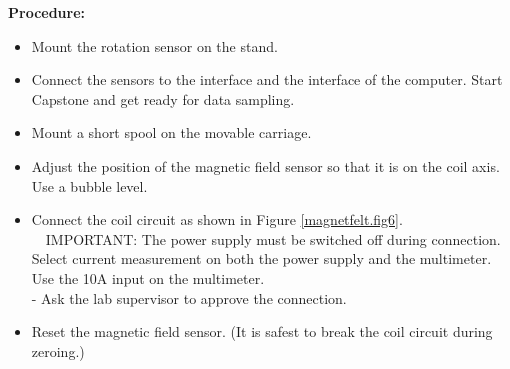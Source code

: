 \documentclass[../Elmag-labhefte-2020.tex]{subfiles}
\begin{document}
\textbf{Procedure:}
\begin{itemize}
    \item Mount the rotation sensor on the stand.
    \item Connect the sensors to the interface and the interface of the computer. Start Capstone and get ready for data sampling.
    \item Mount a short spool on the movable carriage.
    \item Adjust the position of the magnetic field sensor so that it is on the coil axis. Use a bubble level.
    \item Connect the coil circuit as shown in Figure \ref{magnetfelt.fig6}. \ \
    IMPORTANT: The power supply must be switched off during connection. Select current measurement on both the power supply and the multimeter. Use the 10A input on the multimeter.\\
    - Ask the lab supervisor to approve the connection.
    \item Reset the magnetic field sensor. (It is safest to break the coil circuit during zeroing.)
      \begin{marginfigure}[-10cm]
        \centering

\end{marginfigure}
\end{itemize}
\end{document}
